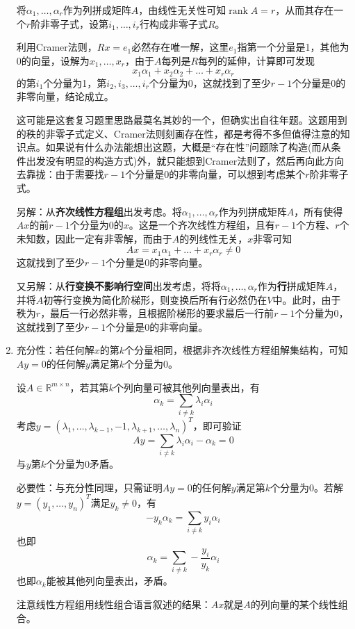 \documentclass[a4paper,UTF8,fontset=windows]{ctexart}
\DeclareMathOperator{\rank}{rank}
\newcommand*{\note}{\noindent *}
\begin{document}
\begin{enumerate}
    将$\alpha_1,\dots,\alpha_r$作为列拼成矩阵$A$，由线性无关性可知$\rank A=r$，从而其存在一个$r$阶非零子式，设第$i_1,\dots,i_r$行构成非零子式$R$。

    利用Cramer法则，$Rx=e_1$必然存在唯一解，这里$e_1$指第一个分量是1，其他为0的向量，设解为$x_1,\dots,x_r$，由于$A$每列是$R$每列的延伸，计算即可发现
    $$x_1\alpha_1+x_2\alpha_2+\dots+x_r\alpha_r$$
    的第$i_1$个分量为1，第$i_2,i_3,\dots,i_r$个分量为0，这就找到了至少$r-1$个分量是0的非零向量，结论成立。

    \note 这可能是这套复习题里思路最莫名其妙的一个，但确实出自往年题。这题用到的秩的非零子式定义、Cramer法则刻画存在性，都是考得不多但值得注意的知识点。如果说有什么办法能想出这题，大概是``存在性''问题除了构造(而从条件出发没有明显的构造方式)外，就只能想到Cramer法则了，然后再向此方向去靠拢：由于需要找$r-1$个分量是0的非零向量，可以想到考虑某个$r$阶非零子式。

    \note 另解：从\textbf{齐次线性方程组}出发考虑。将$\alpha_1,\dots,\alpha_r$作为列拼成矩阵$A$，所有使得$Ax$的前$r-1$个分量为0的$x$。这是一个齐次线性方程组，且有$r-1$个方程、$r$个未知数，因此一定有非零解，而由于$A$的列线性无关，$x$非零可知
    $$Ax=x_1\alpha_1+\dots+x_r\alpha_r\ne0$$
    这就找到了至少$r-1$个分量是0的非零向量。

    \note 又另解：从\textbf{行变换不影响行空间}出发考虑，将将$\alpha_1,\dots,\alpha_r$作为\textbf{行}拼成矩阵$A$，并将$A$初等行变换为简化阶梯形，则变换后所有行必然仍在$V$中。此时，由于秩为$r$，最后一行必然非零，且根据阶梯形的要求最后一行前$r-1$个分量为0，这就找到了至少$r-1$个分量是0的非零向量。

    \item
    充分性：若任何解$x$的第$k$个分量相同，根据非齐次线性方程组解集结构，可知$Ay=0$的任何解$y$满足第$k$个分量为0。

    设$A\in\mathbb{R}^{m\times n}$，若其第$k$个列向量可被其他列向量表出，有
    $$\alpha_k=\sum_{i\ne k}\lambda_i\alpha_i$$
    考虑$y=(\lambda_1,\dots,\lambda_{k-1},-1,\lambda_{k+1},\dots,\lambda_n)^T$，即可验证
    $$Ay=\sum_{i\ne k}\lambda_i\alpha_i-\alpha_k=0$$
    与$y$第$k$个分量为0矛盾。

    必要性：与充分性同理，只需证明$Ay=0$的任何解$y$满足第$k$个分量为0。若解$y=(y_1,\dots,y_n)^T$满足$y_k\ne 0$，有
    $$-y_k\alpha_k=\sum_{i\ne k}y_i\alpha_i$$
    也即
    $$\alpha_k=\sum_{i\ne k}-\frac{y_i}{y_k}\alpha_i$$
    也即$\alpha_k$能被其他列向量表出，矛盾。

    \note 注意线性方程组用线性组合语言叙述的结果：$Ax$就是$A$的列向量的某个线性组合。


\end{enumerate}
\end{document}
